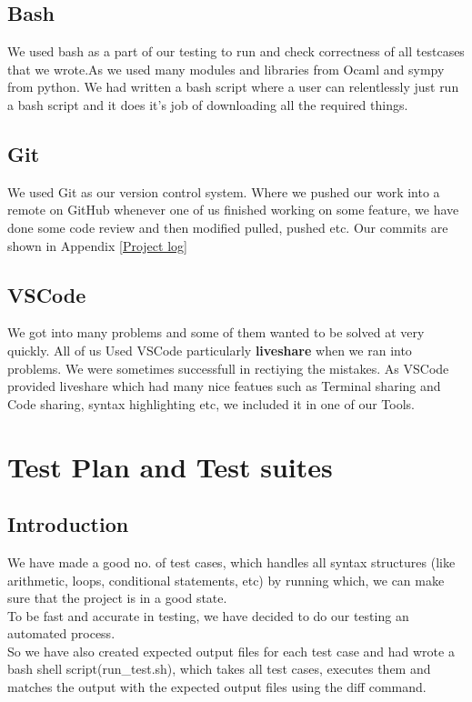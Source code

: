 \documentclass[english,a4paper,12pt]{report}
\begin{document}
\section{Bash}
   We used bash as a part of our testing to run and check correctness of all testcases that we wrote.As we used many
  modules and libraries from Ocaml and sympy from python. We had written a bash script where a user can relentlessly just run a bash script and it does it's job of downloading all the required things. 
  
  \section{Git}
    We used Git as our version control system. Where we pushed our work into a remote on GitHub whenever one of us finished working on some feature, we have done some code review and then modified pulled, pushed etc. Our commits are shown in Appendix \ref{Project log} 
    
  \section{VSCode}
   We got into many problems and some of them wanted to be solved at very quickly. All of us Used VSCode particularly \textbf{liveshare} when we ran into problems. We were sometimes successfull in rectiying the mistakes. As VSCode provided liveshare which had many nice featues such as Terminal sharing and Code sharing, syntax highlighting etc, we included it in one of our Tools.

\chapter{Test Plan and Test suites}
    \section{Introduction}
        We have made a good no. of test cases, which handles all syntax structures (like arithmetic, loops, conditional statements, etc) by running which, we can make sure that the project is in a good state.\\
        To be fast and accurate in testing, we have decided to do our testing an automated process. \\ So we have also created expected output files for each test case and had wrote a bash shell script(run\_test.sh), which takes all test cases, executes them and matches the output with the expected output files using the diff command.
        
\end{document}
